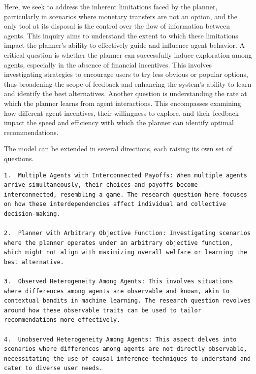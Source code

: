 \documentclass[
  letterpaper,
  numbers=noenddot,
  DIV=11]{scrreprt}
\theoremstyle{plain}
\theoremstyle{definition}
\theoremstyle{remark}
\begin{document}
Here, we seek to address the inherent limitations faced by the planner,
particularly in scenarios where monetary transfers are not an option,
and the only tool at its disposal is the control over the flow of
information between agents. This inquiry aims to understand the extent
to which these limitations impact the planner's ability to effectively
guide and influence agent behavior. A critical question is whether the
planner can successfully induce exploration among agents, especially in
the absence of financial incentives. This involves investigating
strategies to encourage users to try less obvious or popular options,
thus broadening the scope of feedback and enhancing the system's ability
to learn and identify the best alternatives. Another question is
understanding the rate at which the planner learns from agent
interactions. This encompasses examining how different agent incentives,
their willingness to explore, and their feedback impact the speed and
efficiency with which the planner can identify optimal recommendations.

The model can be extended in several directions, each raising its own
set of questions.

\begin{verbatim}
1.  Multiple Agents with Interconnected Payoffs: When multiple agents arrive simultaneously, their choices and payoffs become interconnected, resembling a game. The research question here focuses on how these interdependencies affect individual and collective decision-making.

2.  Planner with Arbitrary Objective Function: Investigating scenarios where the planner operates under an arbitrary objective function, which might not align with maximizing overall welfare or learning the best alternative.

3.  Observed Heterogeneity Among Agents: This involves situations where differences among agents are observable and known, akin to contextual bandits in machine learning. The research question revolves around how these observable traits can be used to tailor recommendations more effectively.

4.  Unobserved Heterogeneity Among Agents: This aspect delves into scenarios where differences among agents are not directly observable, necessitating the use of causal inference techniques to understand and cater to diverse user needs.
\end{verbatim}
\end{document}
